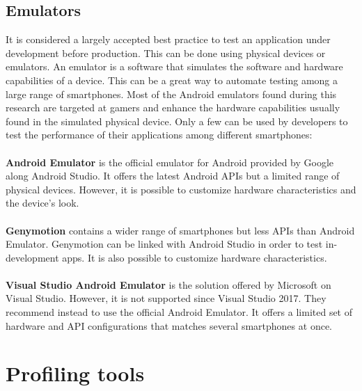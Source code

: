 \documentclass{kththesis}
\begin{document}
\subsection{Emulators}
    It is considered a largely accepted best practice to test an application under development before production. This can be done using physical devices or emulators. An emulator is a software that simulates the software and hardware capabilities of a device\cite{emulator_def}. This can be a great way to automate testing among a large range of smartphones. Most of the Android emulators found during this research are targeted at gamers and enhance the hardware capabilities usually found in the simulated physical device. Only a few can be used by developers to test the performance of their applications among different smartphones:
    
\paragraph{}
\textbf{Android Emulator} \cite{android_emulator} is the official emulator for Android provided by Google along Android Studio. It offers the latest Android APIs but a limited range of physical devices. However, it is possible to customize hardware characteristics and the device's look.

\paragraph{}
\textbf{Genymotion} \cite{genymotion_emulator} contains a wider range of smartphones but less APIs than Android Emulator. Genymotion can be linked with Android Studio in order to test in-development apps. It is also possible to customize hardware characteristics.

\paragraph{}
\textbf{Visual Studio Android Emulator} \cite{microsoft_emulator} is the solution offered by Microsoft on Visual Studio. However, it is not supported since Visual Studio 2017. They recommend instead to use the official Android Emulator. It offers a limited set of hardware and API configurations that matches several smartphones at once. 

\section{Profiling tools}
\end{document}
